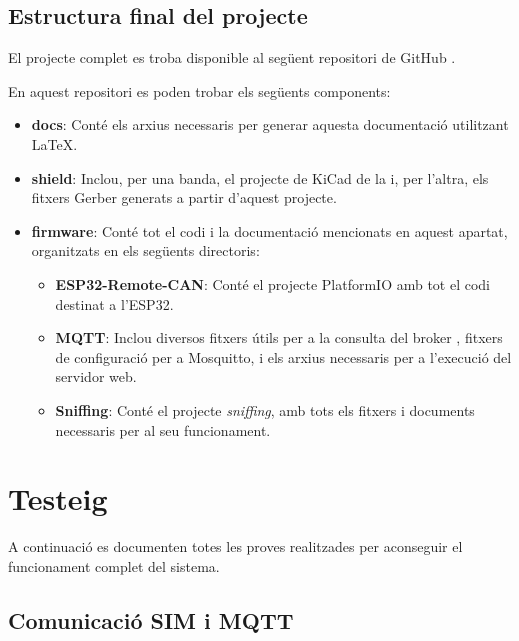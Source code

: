 \documentclass{tfgitic}[2024/07/01]
\begin{document}
\section{Estructura final del projecte}

El projecte complet es troba disponible al següent repositori de GitHub \cite{github_tfg}.

En aquest repositori es poden trobar els següents components:

\begin{itemize}
  \item \textbf{docs}: Conté els arxius necessaris per generar aquesta documentació utilitzant \LaTeX.

  \item \textbf{shield}: Inclou, per una banda, el projecte de KiCad de la  i, per l'altra, els fitxers Gerber generats 
  a partir d'aquest projecte.

  \item \textbf{firmware}: Conté tot el codi i la documentació mencionats en aquest apartat, organitzats en els següents directoris:

  \begin{itemize}
    \item \textbf{ESP32-Remote-CAN}: Conté el projecte PlatformIO amb tot el codi destinat a l'ESP32.

    \item \textbf{MQTT}: Inclou diversos fitxers útils per a la consulta del broker , fitxers de configuració per a Mosquitto, i els arxius 
    necessaris per a l'execució del servidor web.

    \item \textbf{Sniffing}: Conté el projecte \textit{sniffing}, amb tots els fitxers i documents necessaris per al seu funcionament.
  \end{itemize}
\end{itemize}

\chapter{Testeig}

A continuació es documenten totes les proves realitzades per aconseguir el funcionament complet del sistema.

\section{Comunicació SIM i MQTT}
\end{document}
